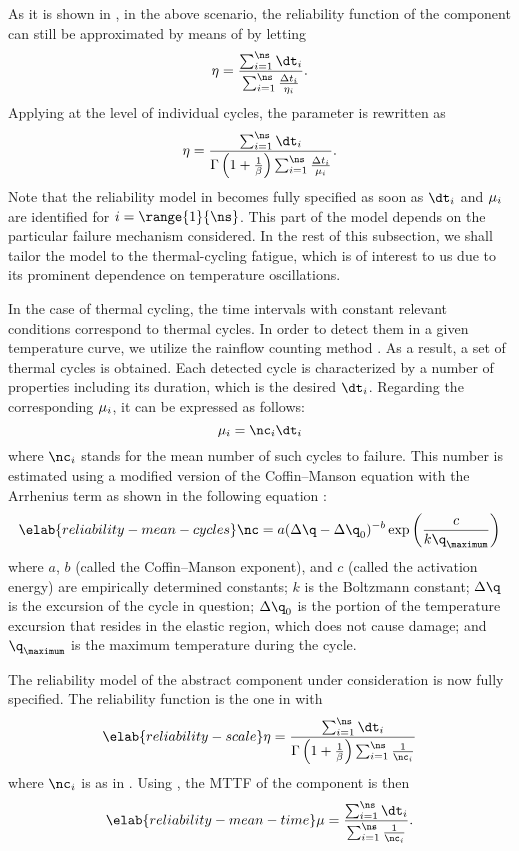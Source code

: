 As it is shown in \cite{xiang2010}, in the above scenario, the reliability
function of the component can still be approximated by means of
 by letting
\[
  \scale = \frac{\sum_{i = 1}^\ns \dt_i}{\sum_{i = 1}^\ns \frac{\Delta t_i}{\scale_i}}.
\]
Applying  at the level of individual cycles, the
parameter is rewritten as
\[
  \scale = \frac{\sum_{i = 1}^\ns \dt_i}{\Gamma\left(1 + \frac{1}{\shape}\right) \sum_{i = 1}^\ns \frac{\Delta t_i}{\mean_i}}.
\]
Note that the reliability model in  becomes fully
specified as soon as $\dt_i$ and $\mu_i$ are identified for $i =
\range{1}{\ns}$. This part of the model depends on the particular failure
mechanism considered. In the rest of this subsection, we shall tailor the model
to the thermal-cycling fatigue, which is of interest to us due to its prominent
dependence on temperature oscillations.

In the case of thermal cycling, the time intervals with constant relevant
conditions correspond to thermal cycles. In order to detect them in a given
temperature curve, we utilize the rainflow counting method \cite{xiang2010}. As
a result, a set of \ns thermal cycles is obtained. Each detected cycle is
characterized by a number of properties including its duration, which is the
desired $\dt_i$. Regarding the corresponding $\mu_i$, it can be expressed as
follows:
\[
  \mean_i = \nc_i \dt_i
\]
where $\nc_i$ stands for the mean number of such cycles to failure. This number
is estimated using a modified version of the Coffin--Manson equation with the
Arrhenius term as shown in the following equation \cite{xiang2010, jedec2010}:
\begin{equation} \elab{reliability-mean-cycles}
  \nc = a (\Delta \q - \Delta \q_0)^{-b} \exp\left(\frac{c}{k \q_\maximum}\right)
\end{equation}
where $a$, $b$ (called the Coffin--Manson exponent), and $c$ (called the
activation energy) are empirically determined constants; $k$ is the Boltzmann
constant; $\Delta \q$ is the excursion of the cycle in question; $\Delta \q_0$
is the portion of the temperature excursion that resides in the elastic region,
which does not cause damage; and $\q_\maximum$ is the maximum temperature during
the cycle.

The reliability model of the abstract component under consideration is now fully
specified. The reliability function is the one in 
with
\begin{equation} \elab{reliability-scale}
  \scale = \frac{\sum_{i = 1}^\ns \dt_i}{\Gamma\left(1 + \frac{1}{\shape}\right) \sum_{i = 1}^\ns \frac{1}{\nc_i}}
\end{equation}
where $\nc_i$ is as in . Using
, the \ac{MTTF} of the
component is then
\begin{equation} \elab{reliability-mean-time}
  \mean = \frac{\sum_{i = 1}^\ns \dt_i}{\sum_{i = 1}^\ns \frac{1}{\nc_i}}.
\end{equation}

